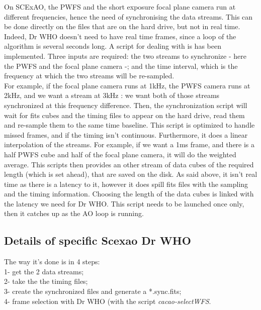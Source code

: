\documentclass[twocolumn]{aastex62}
\begin{document}
On SCExAO, the PWFS and the short exposure focal plane camera run at different frequencies, hence the need of synchronising the data streams. 
This can be done directly on the files that are on the hard drive, but not in real time. Indeed, Dr WHO doesn't need to have real time frames, since a loop of the algorithm is several seconds long. 
A script for dealing with is has been implemented. Three inputs are required: the two streams to synchronize - here the PWFS and the focal plane camera -; and the time interval, which is the frequency at which the two streams will be re-sampled. \\
For example, if the focal plane camera runs at 1kHz, the PWFS camera runs at 2kHz, and we want a stream at 3kHz : we want both of those streams synchronized at this frequency difference. Then, the synchronization script will wait for fits cubes and the timing files to appear on the hard drive, read them and re-sample them to the same time baseline. This script is optimized to handle missed frames, and if the timing isn't continuous. Furthermore, it does a linear interpolation of the streams. For example, if we want a 1ms frame, and there is a half PWFS cube and half of the focal plane camera, it will do the weighted average. 
This scripts then provides an other stream of data cubes of the required length (which is set ahead), that are saved on the disk. As said above, it isn't real time as there is a latency to it, however it does spill fits files with the sampling and the timing information. Choosing the length of the data cubes is linked with the latency we need for Dr WHO. This script needs to be launched once only, then it catches up as the AO loop is running. 

\subsection{Details of specific Scexao Dr WHO }

The way it's done is in 4 steps: \\
1- get the 2 data streams; \\
2- take the the timing files; \\ 
3- create the synchronized files and generate a *.sync.fits;\\ 
4- frame selection with Dr WHO (with the script \textit{cacao-selectWFS}. \\
\end{document}

